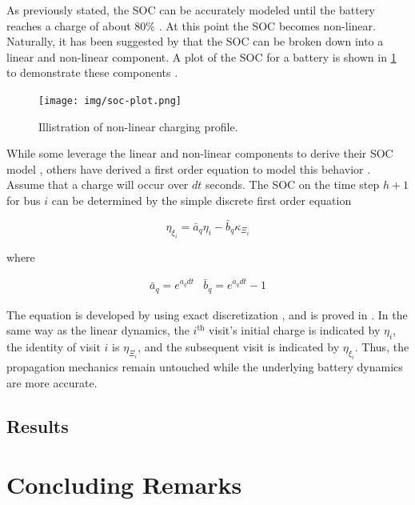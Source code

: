 \documentclass[ee,thesis]{usuthesis}
\begin{document}
As previously stated, the SOC can be accurately modeled until the battery reaches a charge of about 80\%
\cite{liu-2020-batter-elect}. At this point the SOC becomes non-linear. Naturally, it has been suggested by
\cite{zhang-2021-optim-elect} that the SOC can be broken down into a linear and non-linear component. A plot of the SOC
for a battery is shown in \ref{fig:soc-plot} to demonstrate these components \cite{zhang-2021-optim-elect}.

\begin{figure}[htbp]
\centering
\texttt{[image: img/soc-plot.png]}
\caption{\label{fig:soc-plot}Illistration of non-linear charging profile.}
\end{figure}

While some leverage the linear and non-linear components to derive their SOC model \cite{abdollahi-2016-optim-batter},
others have derived a first order equation to model this behavior \cite{whitaker-2023-a-network}. Assume that a charge
will occur over \(dt\) seconds. The SOC on the time step \(h+1\) for bus \(i\) can be determined by the simple discrete first
order equation

\begin{equation}
  \eta_{\xi_i} = \bar{a}_q \eta_i - \bar{b}_q \kappa_{\Xi_i}
\end{equation}

where

\begin{equation}
\begin{array}{cc}
  \bar{a}_q = e^{a_q dt} & \bar{b}_q = e^{a_q dt} - 1
\end{array}
\end{equation}

The equation is developed by using exact discretization \cite{hespanha-2018-linear}, and is proved in
\cite{whitaker-2023-a-network}. In the same way as the linear dynamics, the \(i^{\text{th}}\) visit's initial charge is
indicated by \(\eta_i\), the identity of visit \(i\) is \(\eta_{\Xi_i}\), and the subsequent visit is indicated by \(\eta_{\xi_i}\). Thus,
the propagation mechanics remain untouched while the underlying battery dynamics are more accurate.

\section{Results}
\label{sec:orga6eed22}
\chapter{Concluding Remarks}
\label{sec:conclusion}
\makeappendices
{}
\label{sec:fuzzy-sa-pap}
\end{document}
